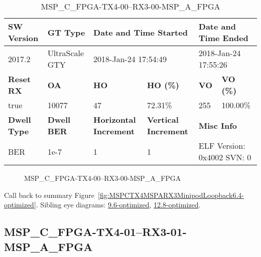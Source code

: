 \begin{table}[h]
\centering
\caption{MSP\_C\_FPGA-TX4-00--RX3-00-MSP\_A\_FPGA}
\label{tab:MSPCFPGATX400RX300MSPAFPGA6.4-optimized}
\begin{tabular}{@{}|l|l|l|l|l|l|@{}}
\toprule
\textbf{SW Version}                & \textbf{GT Type}   & \multicolumn{2}{l|}{\textbf{Date and Time Started}}            & \multicolumn{2}{l|}{\textbf{Date and Time Ended}}        \\ \midrule
2017.2                       & UltraScale GTY          & \multicolumn{2}{l|}{2018-Jan-24 17:54:49}                   & \multicolumn{2}{l|}{2018-Jan-24 17:55:26}               \\ \midrule
\textbf{Reset RX}                  & \textbf{OA} & \textbf{HO}   & \textbf{HO (\%)} & \textbf{VO} & \textbf{VO (\%)} \\ \midrule
true & 10077        & 47          & 72.31\%        & 255        & 100.00\%       \\ \midrule
\textbf{Dwell Type}                & \textbf{Dwell BER} & \textbf{Horizontal Increment} & \textbf{Vertical Increment}    & \multicolumn{2}{l|}{\textbf{Misc Info}}                  \\ \midrule
BER                            & 1e-7        & 1        & 1           & \multicolumn{2}{l|}{ELF Version: 0x4002 SVN: 0}                         \\ \bottomrule
\end{tabular}
\end{table}

\begin{figure}[h]
\caption{MSP\_C\_FPGA-TX4-00--RX3-00-MSP\_A\_FPGA} \label{fig:MSPCFPGATX400RX300MSPAFPGA6.4-optimized}
\end{figure}

Call back to summary Figure~\ref{fig:MSPCTX4MSPARX3MinipodLoopback6.4-optimized}.
Sibling eye diagrams: \hyperref[sec:MSPCFPGATX400RX300MSPAFPGA9.6-optimized]{9.6-optimized}, \hyperref[sec:MSPCFPGATX400RX300MSPAFPGA12.8-optimized]{12.8-optimized}.

\clearpage
\newpage


\subsection{MSP\_C\_FPGA-TX4-01--RX3-01-MSP\_A\_FPGA}\label{sec:MSPCFPGATX401RX301MSPAFPGA6.4-optimized}

